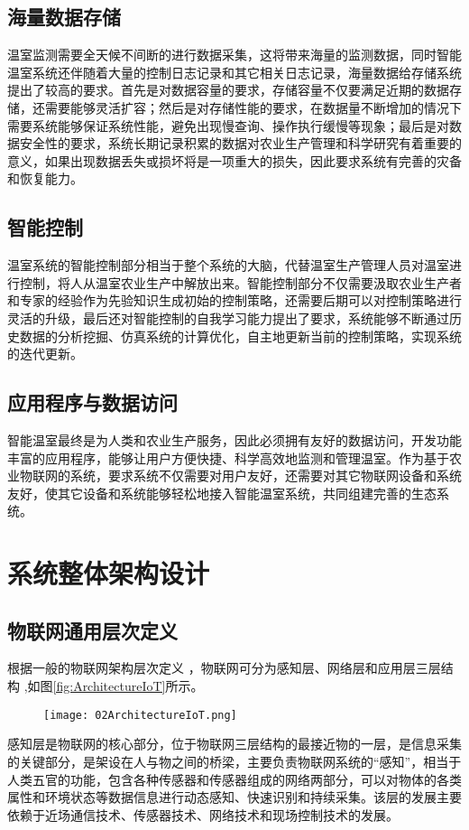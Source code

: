 	\subsection{海量数据存储}
温室监测需要全天候不间断的进行数据采集，这将带来海量的监测数据，同时智能温室系统还伴随着大量的控制日志记录和其它相关日志记录，海量数据给存储系统提出了较高的要求\supercite{SunHongying2010}。首先是对数据容量的要求，存储容量不仅要满足近期的数据存储，还需要能够灵活扩容；然后是对存储性能的要求，在数据量不断增加的情况下需要系统能够保证系统性能，避免出现慢查询、操作执行缓慢等现象；最后是对数据安全性的要求，系统长期记录积累的数据对农业生产管理和科学研究有着重要的意义，如果出现数据丢失或损坏将是一项重大的损失，因此要求系统有完善的灾备和恢复能力。
	\subsection{智能控制}
温室系统的智能控制部分相当于整个系统的大脑，代替温室生产管理人员对温室进行控制，将人从温室农业生产中解放出来。智能控制部分不仅需要汲取农业生产者和专家的经验作为先验知识生成初始的控制策略，还需要后期可以对控制策略进行灵活的升级，最后还对智能控制的自我学习能力提出了要求，系统能够不断通过历史数据的分析挖掘、仿真系统的计算优化，自主地更新当前的控制策略，实现系统的迭代更新。
	\subsection{应用程序与数据访问}
智能温室最终是为人类和农业生产服务，因此必须拥有友好的数据访问，开发功能丰富的应用程序，能够让用户方便快捷、科学高效地监测和管理温室。作为基于农业物联网的系统，要求系统不仅需要对用户友好，还需要对其它物联网设备和系统友好，使其它设备和系统能够轻松地接入智能温室系统，共同组建完善的生态系统。


\section{系统整体架构设计}
	\subsection{物联网通用层次定义}
	根据一般的物联网架构层次定义\supercite{Yu2011,LiuQiang2010} ，物联网可分为感知层、网络层和应用层三层结构\supercite{HanYi2016A,WangHuaiyu2015} ,如图\ref{fig:ArchitectureIoT}所示。
	
	\begin{figure}[!htbp]
  		\centering
 		\texttt{[image: 02ArchitectureIoT.png]}
	\end{figure}
	感知层是物联网的核心部分，位于物联网三层结构的最接近物的一层，是信息采集的关键部分，是架设在人与物之间的桥梁，主要负责物联网系统的“感知”，相当于人类五官的功能，包含各种传感器和传感器组成的网络两部分，可以对物体的各类属性和环境状态等数据信息进行动态感知、快速识别和持续采集。该层的发展主要依赖于近场通信技术、传感器技术、网络技术和现场控制技术的发展。
	
